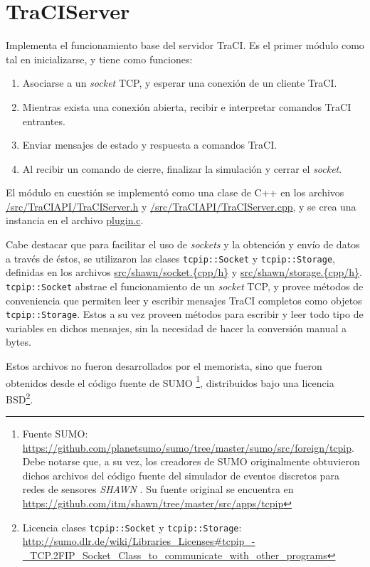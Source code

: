 \section{TraCIServer}\label{sec:traciserver}

Implementa el funcionamiento base del servidor TraCI. Es el primer módulo como tal en inicializarse, y tiene como funciones:

\begin{enumerate}
    \item Asociarse a un \emph{socket} TCP, y esperar una conexión de un cliente TraCI.
    \item Mientras exista una conexión abierta, recibir e interpretar comandos TraCI entrantes.
    \item Enviar mensajes de estado y respuesta a comandos TraCI.
    \item Al recibir un comando de cierre, finalizar la simulación y cerrar el \emph{socket}.
\end{enumerate}

El módulo en cuestión se implementó como una clase de C++ en los archivos \href{https://github.com/molguin92/paramics_traci/blob/master/src/TraCIAPI/TraCIServer.h}{/src/TraCIAPI/TraCIServer.h} y \href{https://github.com/molguin92/paramics_traci/blob/master/src/TraCIAPI/TraCIServer.cpp}{/src/TraCIAPI/TraCIServer.cpp}, y se crea una instancia en el archivo \href{https://github.com/molguin92/paramics_traci/blob/master/src/plugin.c}{plugin.c}.

Cabe destacar que para facilitar el uso de \emph{sockets} y la obtención y envío de datos a través de éstos, se utilizaron las clases \texttt{tcpip::Socket} y \texttt{tcpip::Storage}, definidas en los archivos \href{https://github.com/molguin92/paramics_traci/blob/master/src/shawn/socket.h}{src/shawn/socket.\{cpp/h\}} y \href{https://github.com/molguin92/paramics_traci/blob/master/src/shawn/storage.h}{src/shawn/storage.\{cpp/h\}}. \texttt{tcpip::Socket} abstrae el funcionamiento de un \textit{socket} TCP, y provee métodos de conveniencia que permiten leer y escribir mensajes TraCI completos como objetos \texttt{tcpip::Storage}. Estos a su vez proveen métodos para escribir y leer todo tipo de variables en dichos mensajes, sin la necesidad de hacer la conversión manual a bytes.

Estos archivos no fueron desarrollados por el memorista, sino que fueron obtenidos desde el código fuente de SUMO \footnote{Fuente SUMO: \url{https://github.com/planetsumo/sumo/tree/master/sumo/src/foreign/tcpip}. Debe notarse que, a su vez, los creadores de SUMO originalmente obtuvieron dichos archivos del código fuente del simulador de eventos discretos para redes de sensores \emph{SHAWN} \cite{kroller2005shawn}. Su fuente original se encuentra en \url{https://github.com/itm/shawn/tree/master/src/apps/tcpip}}, distribuidos bajo una licencia BSD\footnote{Licencia clases \texttt{tcpip::Socket} y \texttt{tcpip::Storage}: \url{http://sumo.dlr.de/wiki/Libraries_Licenses\#tcpip_-_TCP.2FIP_Socket_Class_to_communicate_with_other_programs}}.


